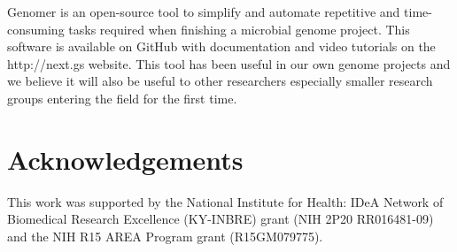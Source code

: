 \documentclass[10pt]{article}
\begin{document}
Genomer is an open-source tool to simplify and automate repetitive and
time-consuming tasks required when finishing a microbial genome project. This
software is available on GitHub \cite{genomer-github} with documentation and
video tutorials on the http://next.gs website. This tool has been useful in our
own genome projects and we believe it will also be useful to other researchers
especially smaller research groups entering the field for the first time.

\section*{Acknowledgements}

This work was supported by the National Institute for Health: IDeA Network of
Biomedical Research Excellence (KY-INBRE) grant (NIH 2P20 RR016481-09) and the
NIH R15 AREA Program grant (R15GM079775).


\end{document}
